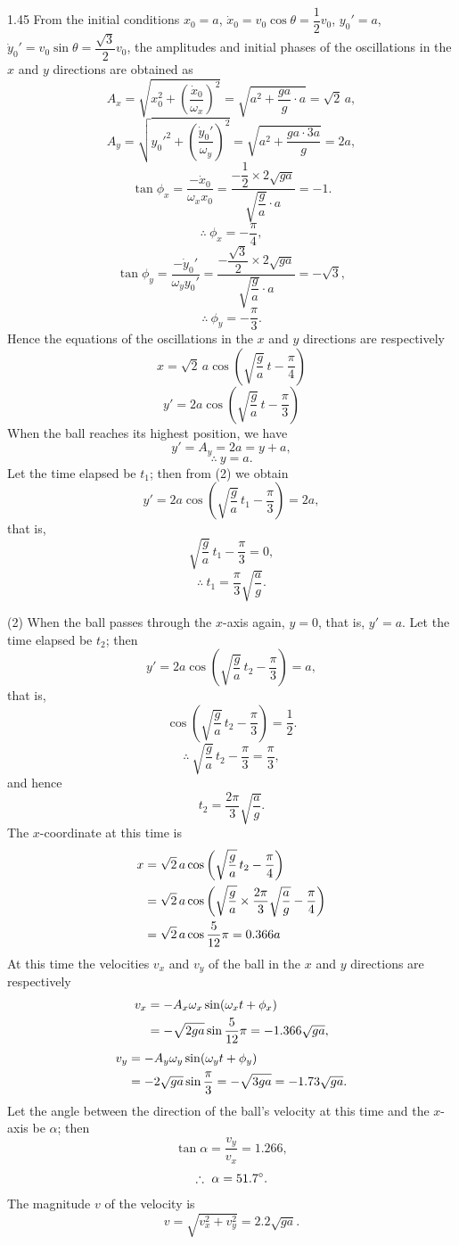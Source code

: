 \begin{solution}{1.45}
From the initial conditions $x_0=a$, $\dot x_0=v_0\cos\theta=\dfrac{1}{2}v_0$, $y_0'=a$, $\dot y_0'=v_0\sin\theta=\dfrac{\sqrt3}{2}v_0$, the amplitudes and initial phases of the oscillations in the $x$ and $y$ directions are obtained as
\[
A_x=\sqrt{x_0^2+\left(\frac{\dot x_0}{\omega_x}\right)^2}=\sqrt{a^2+\frac{ga}{g}\cdot a}=\sqrt2\,a,
\]
\[
A_y=\sqrt{y_0'^2+\left(\frac{\dot y_0'}{\omega_y}\right)^2}=\sqrt{a^2+\frac{ga\cdot3a}{g}}=2a,
\]
\[
\tan\phi_x=\frac{-\dot x_0}{\omega_xx_0}=\frac{-\dfrac{1}{2}\times2\sqrt{ga}}{\sqrt{\dfrac{g}{a}}\cdot a}=-1.
\]
\[
\therefore\ \phi_x=-\frac{\pi}{4},
\]
\[
\tan\phi_y=\frac{-\dot y_0'}{\omega_yy_0'}=\frac{-\dfrac{\sqrt3}{2}\times2\sqrt{ga}}{\sqrt{\dfrac{g}{a}}\cdot a}=-\sqrt3,
\]
\[
\therefore\ \phi_y=-\frac{\pi}{3}.
\]
Hence the equations of the oscillations in the $x$ and $y$ directions are respectively
\begin{equation}
x=\sqrt2\,a\cos\left(\sqrt{\frac{g}{a}}\,t-\frac{\pi}{4}\right) \tag{1}
\end{equation}
\begin{equation}
y'=2a\cos\left(\sqrt{\frac{g}{a}}\,t-\frac{\pi}{3}\right) \tag{2}
\end{equation}
When the ball reaches its highest position, we have
\[
y'=A_y=2a=y+a,
\]
\[
\therefore\ y=a.
\]
Let the time elapsed be $t_1$; then from (2) we obtain
\[
y'=2a\cos\left(\sqrt{\frac{g}{a}}\,t_1-\frac{\pi}{3}\right)=2a,
\]
that is,
\[
\sqrt{\frac{g}{a}}\,t_1-\frac{\pi}{3}=0,
\]
\[
\therefore\ t_1=\frac{\pi}{3}\sqrt{\frac{a}{g}}.
\]

(2) When the ball passes through the $x$-axis again, $y=0$, that is, $y'=a$. Let the time elapsed be $t_2$; then
\[
y'=2a\cos\left(\sqrt{\frac{g}{a}}\,t_2-\frac{\pi}{3}\right)=a,
\]
that is,
\[
\cos\left(\sqrt{\frac{g}{a}}\,t_2-\frac{\pi}{3}\right)=\frac{1}{2}.
\]
\[
\therefore\ \sqrt{\frac{g}{a}}\,t_2-\frac{\pi}{3}=\frac{\pi}{3},
\]
and hence
\[
t_2=\frac{2\pi}{3}\sqrt{\frac{a}{g}}.
\]
The $x$-coordinate at this time is
\begin{align}
x&=\sqrt2\,a\cos\left(\sqrt{\frac{g}{a}}\,t_2-\frac{\pi}{4}\right)\notag\\
&=\sqrt2\,a\cos\left(\sqrt{\frac{g}{a}}\times\frac{2\pi}{3}\sqrt{\frac{a}{g}}-\frac{\pi}{4}\right)\notag\\
&=\sqrt2\,a\cos\frac{5}{12}\pi=0.366a
\end{align}
At this time the velocities $v_x$ and $v_y$ of the ball in the $x$ and $y$ directions are respectively
\begin{align}
v_x&=-A_x\omega_x\sin(\omega_xt+\phi_x)\notag\\
&=-\sqrt{2ga}\sin\frac{5}{12}\pi=-1.366\sqrt{ga},
\end{align}
\begin{align}
v_y&=-A_y\omega_y\sin(\omega_yt+\phi_y)\notag\\
&=-2\sqrt{ga}\sin\frac{\pi}{3}=-\sqrt{3ga}=-1.73\sqrt{ga}.
\end{align}
Let the angle between the direction of the ball's velocity at this time and the $x$-axis be $\alpha$; then
\[
\tan\alpha=\frac{v_y}{v_x}=1.266,
\]
\[
\therefore\ \alpha=51.7^{\circ}.
\]
The magnitude $v$ of the velocity is
\[
v=\sqrt{v_x^2+v_y^2}=2.2\sqrt{ga}.
\]


\end{solution}

